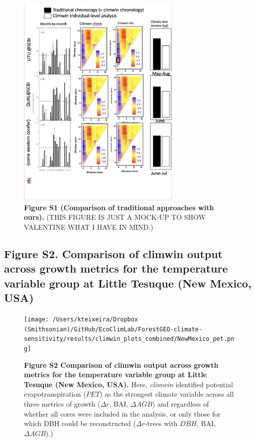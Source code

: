 \documentclass[
]{article}
\begin{document}
\begin{figure}
\centering
\includegraphics[width=0.7\textwidth,height=\textheight]{tables_figures/mock_comparison_traditional_method.png}
\caption{\textbf{Figure S1 \textbar{} (Comparison of traditional
approaches with ours).} (THIS FIGURE IS JUST A MOCK-UP TO SHOW VALENTINE
WHAT I HAVE IN MIND.)}
\end{figure}

\newpage

\hypertarget{figure-s2.-comparison-of-climwin-output-across-growth-metrics-for-the-temperature-variable-group-at-little-tesuque-new-mexico-usa}{%
\subsection{Figure S2. Comparison of climwin output across growth
metrics for the temperature variable group at Little Tesuque (New
Mexico,
USA)}\label{figure-s2.-comparison-of-climwin-output-across-growth-metrics-for-the-temperature-variable-group-at-little-tesuque-new-mexico-usa}}

\begin{figure}
\centering
\texttt{[image: /Users/kteixeira/Dropbox (Smithsonian)/GitHub/EcoClimLab/ForestGEO-climate-sensitivity/results/climwin\_plots\_combined/NewMexico\_pet.png]}
\caption{\textbf{Figure S2 \textbar{} Comparison of climwin output
across growth metrics for the temperature variable group at Little
Tesuque (New Mexico, USA).} Here, \emph{climwin} identified potential
evapotranspiration (\(PET\)) as the strongest climate variable across
all three metrics of growth (\(\Delta r\), BAI, \(\Delta AGB\)) and
regardless of whether all cores were included in the analysis, or only
those for which DBH could be reconstructed (\(\Delta r\)-trees with
\(DBH\), BAI, \(\Delta AGB\)).)}
\end{figure}
\end{document}

